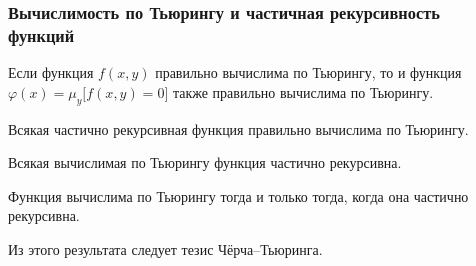 \subsubsection{Вычислимость по Тьюрингу и частичная рекурсивность функций}
\begin{theorem}
    Если функция $f(x, y)$ правильно вычислима по Тьюрингу, то и функция $\varphi(x) = \mu_y\big[f(x, y) = 0\big]$ также правильно вычислима по Тьюрингу.
\end{theorem}
\begin{corollary*}
    Всякая частично рекурсивная функция правильно вычислима по Тьюрингу. 
\end{corollary*}
\begin{theorem}
    Всякая вычислимая по Тьюрингу функция частично рекурсивна.
\end{theorem}
\begin{theorem}
    Функция вычислима по Тьюрингу тогда и только тогда, когда она частично рекурсивна.
\end{theorem}
Из этого результата следует тезис Чёрча--Тьюринга. 